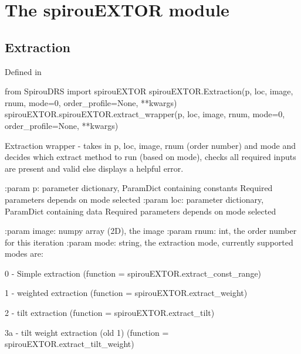 
\clearpage
\newpage
\noindent\begin{minipage}{\textwidth}
\section{The spirouEXTOR module}
\label{ch:the_module:spirouEXTOR}


\subsection{Extraction}

Defined in \spirouEXTOR{}

\begin{pythonbox}
from SpirouDRS import spirouEXTOR
spirouEXTOR.Extraction(p, loc, image, rnum, mode=0, order_profile=None, **kwargs)
spirouEXTOR.spirouEXTOR.extract_wrapper(p, loc, image, rnum, mode=0, order_profile=None, **kwargs)
\end{pythonbox}

\begin{pythondocstring}
Extraction wrapper - takes in p, loc, image, rnum (order number) and mode
and decides which extract method to run (based on mode), checks all
required inputs are present and valid else displays a helpful error.

:param p: parameter dictionary, ParamDict containing constants
        Required parameters depends on mode selected
:param loc: parameter dictionary, ParamDict containing data
        Required parameters depends on mode selected

:param image: numpy array (2D), the image
:param rnum: int, the order number for this iteration
:param mode: string, the extraction mode, currently supported modes are:

        0 - Simple extraction
                (function = spirouEXTOR.extract_const_range)

        1 - weighted extraction
                (function = spirouEXTOR.extract_weight)

        2 - tilt extraction
                (function = spirouEXTOR.extract_tilt)

        3a - tilt weight extraction (old 1)
                (function = spirouEXTOR.extract_tilt_weight)


\end{pythondocstring}
\end{minipage}

